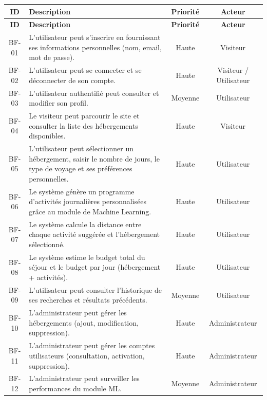 \documentclass[12pt,a4paper]{report}
\begin{document}
\begin{longtable}{|c|p{8cm}|c|c|}
\hline
\textbf{ID} & \textbf{Description} & \textbf{Priorité} & \textbf{Acteur} \\
\hline
\endfirsthead
\hline
\textbf{ID} & \textbf{Description} & \textbf{Priorité} & \textbf{Acteur} \\
\hline
\endhead
BF-01 & L'utilisateur peut s'inscrire en fournissant ses informations
        personnelles (nom, email, mot de passe). & Haute & Visiteur \\
\hline
BF-02 & L'utilisateur peut se connecter et se déconnecter de son compte.
       & Haute & Visiteur / Utilisateur \\
\hline
BF-03 & L'utilisateur authentifié peut consulter et modifier son profil.
       & Moyenne & Utilisateur \\
\hline
BF-04 & Le visiteur peut parcourir le site et consulter la liste des
        hébergements disponibles. & Haute & Visiteur \\
\hline
BF-05 & L'utilisateur peut sélectionner un hébergement, saisir le nombre
        de jours, le type de voyage et ses préférences personnelles.
       & Haute & Utilisateur \\
\hline
BF-06 & Le système génère un programme d'activités journalières
        personnalisées grâce au module de Machine Learning.
       & Haute & Utilisateur \\
\hline
BF-07 & Le système calcule la distance entre chaque activité suggérée et
        l'hébergement sélectionné. & Haute & Utilisateur \\
\hline
BF-08 & Le système estime le budget total du séjour et le budget par jour
        (hébergement + activités). & Haute & Utilisateur \\
\hline
BF-09 & L'utilisateur peut consulter l'historique de ses recherches et
        résultats précédents. & Moyenne & Utilisateur \\
\hline
BF-10 & L'administrateur peut gérer les hébergements (ajout, modification,
        suppression). & Haute & Administrateur \\
\hline
BF-11 & L'administrateur peut gérer les comptes utilisateurs (consultation,
        activation, suppression). & Haute & Administrateur \\
\hline
BF-12 & L'administrateur peut surveiller les performances du module ML.
       & Moyenne & Administrateur \\
\hline
\end{longtable}
\end{document}
